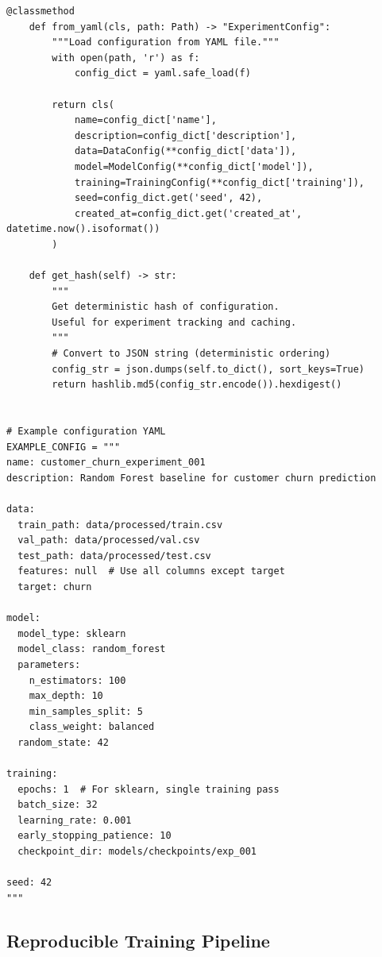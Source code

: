 \begin{lstlisting}[style=python, caption=Comprehensive configuration system]
    @classmethod
    def from_yaml(cls, path: Path) -> "ExperimentConfig":
        """Load configuration from YAML file."""
        with open(path, 'r') as f:
            config_dict = yaml.safe_load(f)

        return cls(
            name=config_dict['name'],
            description=config_dict['description'],
            data=DataConfig(**config_dict['data']),
            model=ModelConfig(**config_dict['model']),
            training=TrainingConfig(**config_dict['training']),
            seed=config_dict.get('seed', 42),
            created_at=config_dict.get('created_at', datetime.now().isoformat())
        )

    def get_hash(self) -> str:
        """
        Get deterministic hash of configuration.
        Useful for experiment tracking and caching.
        """
        # Convert to JSON string (deterministic ordering)
        config_str = json.dumps(self.to_dict(), sort_keys=True)
        return hashlib.md5(config_str.encode()).hexdigest()


# Example configuration YAML
EXAMPLE_CONFIG = """
name: customer_churn_experiment_001
description: Random Forest baseline for customer churn prediction

data:
  train_path: data/processed/train.csv
  val_path: data/processed/val.csv
  test_path: data/processed/test.csv
  features: null  # Use all columns except target
  target: churn

model:
  model_type: sklearn
  model_class: random_forest
  parameters:
    n_estimators: 100
    max_depth: 10
    min_samples_split: 5
    class_weight: balanced
  random_state: 42

training:
  epochs: 1  # For sklearn, single training pass
  batch_size: 32
  learning_rate: 0.001
  early_stopping_patience: 10
  checkpoint_dir: models/checkpoints/exp_001

seed: 42
"""
\end{lstlisting}

\subsection{Reproducible Training Pipeline}


